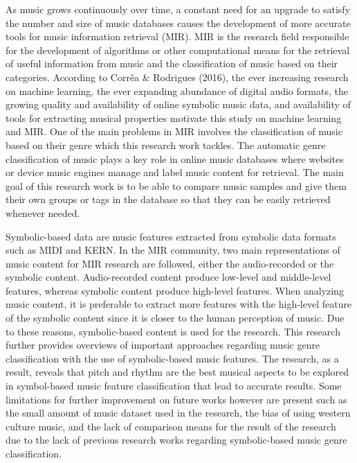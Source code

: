 As music grows continuously over time, a constant need for an upgrade to satisfy the number and size of music databases causes the development of more accurate tools for music information retrieval (MIR). MIR is the research field responsible for the development of algorithms or other computational means for the retrieval of useful information from music and the classification of music based on their categories. According to Corrêa \& Rodrigues (2016), the ever increasing research on machine learning, the ever expanding abundance of digital audio formats, the growing quality and availability of online symbolic music data, and availability of tools for extracting musical properties motivate this study on machine learning and MIR. One of the main problems in MIR involves the classification of music based on their genre which this research work tackles. The automatic genre classification of music plays a key role in online music databases where websites or device music engines manage and label music content for retrieval. The main goal of this research work is to be able to compare music samples and give them their own groups or tags in the database so that they can be easily retrieved whenever needed.

	Symbolic-based data are music features extracted from symbolic data formats such as MIDI and KERN. In the MIR community, two main representations of music content for MIR research are followed, either the audio-recorded or the symbolic content. Audio-recorded content produce low-level and middle-level features, whereas symbolic content produce high-level features. When analyzing music content, it is preferable to extract more features with the high-level feature of the symbolic content since it is closer to the human perception of music. Due to these reasons, symbolic-based content is used for the research. This research further provides overviews of important approaches regarding music genre classification with the use of symbolic-based music features. The research, as a result, reveals that pitch and rhythm are the best musical aspects to be explored in symbol-based music feature classification that lead to accurate results.  Some limitations for further improvement on future works however are present such as the small amount of music dataset used in the research, the bias of using western culture music, and the lack of comparison means for the result of the research due to the lack of previous research works regarding symbolic-based music genre classification.

